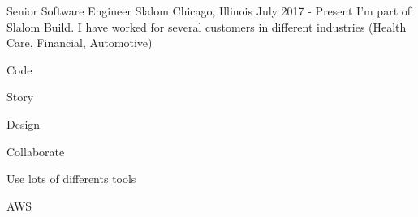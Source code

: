 
\begin{cventries}

  \cventryfive
    {Senior Software Engineer} %
    {Slalom} %
    {Chicago, Illinois} %
    {July 2017 - Present} %
    {I'm part of Slalom Build. I have worked for several customers in different industries (Health Care, Financial, Automotive)}
    {
      \begin{cvitems} %
        \item {Code}
        \item {Story}
        \item {Design}
        \item {Collaborate}
        \item {Use lots of differents tools}
        \item {AWS}
      \end{cvitems}
    }


\end{cventries}
